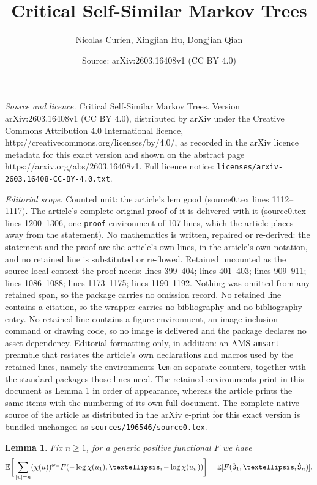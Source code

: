\documentclass[10pt,a4paper]{amsart}
\title{Critical Self-Similar Markov Trees}
\author{Nicolas Curien, Xingjian Hu, Dongjian Qian}
\date{Source: arXiv:2603.16408v1 (CC BY 4.0)}
\newtheorem{lem}{Lemma}
\begin{document}
\maketitle

\noindent\emph{Source and licence.} Critical Self-Similar Markov Trees. Version arXiv:2603.16408v1 (CC BY 4.0), distributed by arXiv under the Creative Commons Attribution 4.0 International licence, http://creativecommons.org/licenses/by/4.0/, as recorded in the arXiv licence metadata for this exact version and shown on the abstract page https://arxiv.org/abs/2603.16408v1. Full licence notice: \texttt{licenses/arxiv-2603.16408-CC-BY-4.0.txt}.\par\smallskip

\noindent\textit{Editorial scope.} Counted unit: the article's lem good (source0.tex lines 1112--1117). The article's complete original proof of it is delivered with it (source0.tex lines 1200--1306, one \texttt{proof} environment of 107 lines, which the article places away from the statement). No mathematics is written, repaired or re-derived: the statement and the proof are the article's own lines, in the article's own notation, and no retained line is substituted or re-flowed.  Retained uncounted as the source-local context the proof needs: lines 399--404; lines 401--403; lines 909--911; lines 1086--1088; lines 1173--1175; lines 1190--1192.  Nothing was omitted from any retained span, so the package carries no omission record.  No retained line contains a citation, so the wrapper carries no bibliography and no bibliography entry.  No retained line contains a figure environment, an image-inclusion command or drawing code, so no image is delivered and the package declares no asset dependency.  Editorial formatting only, in addition: an AMS \texttt{amsart} preamble that restates the article's own declarations and macros used by the retained lines, namely the environments \texttt{lem} on separate counters, together with the standard packages those lines need.  The retained environments print in this document as Lemma 1 in order of appearance, whereas the article prints the same items with the numbering of its own full document.  The complete native source of the article as distributed in the arXiv e-print for this exact version is bundled unchanged as \texttt{sources/196546/source0.tex}.
\begin{lem}\label{lem: many-to-one}
Fix $n \geq 1$, for a generic positive functional $F$ we have
\begin{equation}\label{eq: many-to-one}
\mathbb{E}\bigg[\sum_{|u|=n} (\chi(u))^{\omega_-}F(-\log\chi(u_1), \ldots, -\log\chi(u_n))\bigg] = {\tt E}[F({\hat{\tt S}}_1, \ldots, {\hat{\tt S}}_n)].
\end{equation}
\end{lem}
\end{document}
